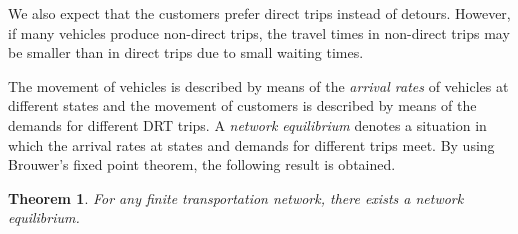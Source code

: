 \documentclass[dissertation,draft*]{aaltoseries}
\newtheorem{theorem}{Theorem}
\begin{document}
We also expect that the customers prefer direct trips instead of detours.
However, if many vehicles produce non-direct trips, 
the travel times in non-direct trips may be smaller than in direct trips due 
to small waiting times.

The movement of vehicles is described by means of the \emph{arrival rates}
of vehicles at different states and
the movement of customers is described by means of the demands 
for different DRT trips. 
A \emph{network equilibrium} denotes a situation in which the arrival rates at states and demands for different trips meet.
% 
By using Brouwer's fixed point theorem, the following result is obtained.

\begin{theorem}
For any finite transportation network, there exists a network equilibrium.
\end{theorem}
\end{document}
